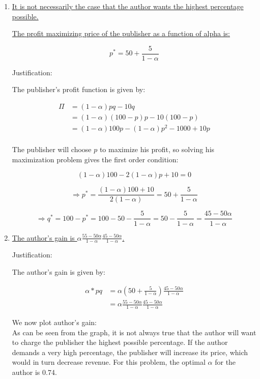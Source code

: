 \documentclass{article}
\newenvironment{solution}{\color{red}}{\color{black}}
\begin{document}
\begin{solution}

\begin{enumerate}
\item \underline{It is not necessarily the case that the author wants the highest percentage possible.}

\underline{The profit maximizing price of the publisher as a function of alpha is:}

\[ p^{*} = 50 + \frac5{1 - \alpha} \]

Justification:

The publisher's profit function is given by:

\begin{align*}
\Pi &= (1 - \alpha)pq - 10q \\
 &= (1-\alpha)(100 - p)p - 10(100-p) \\
 &= (1-\alpha)100p - (1-\alpha)p^2-1000+10p \\
\end{align*}

The publisher will choose $p$ to maximize his profit, so solving his maximization problem gives the first order condition:

\[ (1-\alpha)100-2(1-\alpha)p+10=0 \]

\[ \Rightarrow p^{*}=\frac{(1-\alpha)100+10}{2(1-\alpha)}=50+\frac{5}{1-\alpha} \]

\[ \Rightarrow q^{*}=100-p^{*}=100-50-\frac5{1-\alpha}=50-\frac5{1-\alpha}=\frac{45-50\alpha}{1-\alpha} \]

\item \underline{The author's gain is $\alpha\frac{55-50\alpha}{1-\alpha}\frac{45-50\alpha}{1-\alpha}$.}

Justification:

The author's gain is given by:

\begin{align*}
\alpha*pq &= \alpha\left(50+\frac5{1-\alpha}\right)\frac{45-50\alpha}{1-\alpha} \\
 &=\alpha\frac{55-50\alpha}{1-\alpha}\frac{45-50\alpha}{1-\alpha}
\end{align*}

We now plot author's gain:\\
As can be seen from the graph, it is not always true that the author will want to charge the publisher the highest possible percentage. If the author demands a very high percentage, the publisher will increase its price, which would in turn decrease revenue. For this problem, the optimal $\alpha$ for the author is 0.74.
\end{enumerate}

\end{solution}
\end{document}
